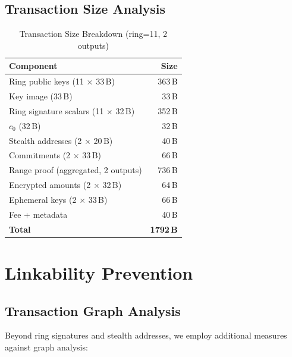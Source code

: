 \documentclass[11pt,a4paper]{article}
\begin{document}
\subsection{Transaction Size Analysis}

\begin{table}[h]
\centering
\caption{Transaction Size Breakdown (ring=11, 2 outputs)}
\label{tab:tx-size}
\begin{tabular}{@{}lr@{}}
\toprule
\textbf{Component} & \textbf{Size} \\
\midrule
Ring public keys (11 $\times$ 33\,B)    & 363\,B \\
Key image (33\,B)                        & 33\,B \\
Ring signature scalars (11 $\times$ 32\,B) & 352\,B \\
$c_0$ (32\,B)                            & 32\,B \\
Stealth addresses (2 $\times$ 20\,B)    & 40\,B \\
Commitments (2 $\times$ 33\,B)          & 66\,B \\
Range proof (aggregated, 2 outputs)     & 736\,B \\
Encrypted amounts (2 $\times$ 32\,B)    & 64\,B \\
Ephemeral keys (2 $\times$ 33\,B)       & 66\,B \\
Fee + metadata                           & 40\,B \\
\midrule
\textbf{Total}                           & \textbf{1792\,B} \\
\bottomrule
\end{tabular}
\end{table}

\section{Linkability Prevention}
\label{sec:linkability}

\subsection{Transaction Graph Analysis}

Beyond ring signatures and stealth addresses, we employ additional
measures against graph analysis:
\end{document}
